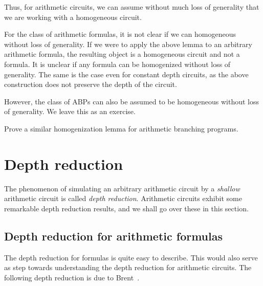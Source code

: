 Thus, for arithmetic circuits, we can assume without much loss of generality that we are working with a homogeneous circuit. 

\begin{remark*}
For the class of arithmetic formulas, it is not clear if we can homogeneous without loss of generality. If we were to apply the above lemma to an arbitrary arithmetic formula, the resulting object is a homogeneous circuit and not a formula. It is unclear if any formula can be homogenized without loss of generality. The same is the case even for constant depth circuits, as the above construction does not preserve the depth of the circuit. 

However, the class of ABPs can also be assumed to be homogeneous without loss of generality. We leave this as an exercise. 
\end{remark*}

\begin{exercise}
Prove a similar homogenization lemma for arithmetic branching programs. 
\end{exercise}

\section{Depth reduction}

The phenomenon of simulating an arbitrary arithmetic circuit by a \emph{shallow} arithmetic circuit is called \emph{depth reduction}. Arithmetic circuits exhibit some remarkable depth reduction results, and we shall go over these in this section. 

\subsection{Depth reduction for arithmetic formulas}

The depth reduction for formulas is quite easy to describe. This would also serve as step towards understanding the depth reduction for arithmetic circuits. The following depth reduction is due to Brent~\cite{brent74}. 

